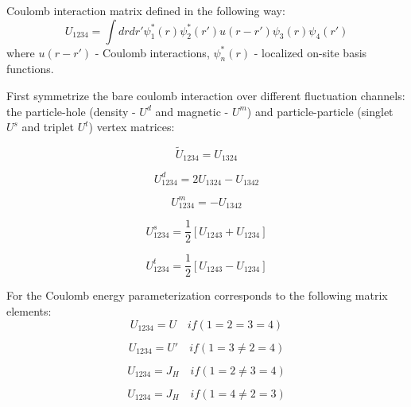 Coulomb interaction matrix defined in the following way:
\begin{equation}
U_{1234} = \int dr dr' \psi^*_{1}(r) \psi^*_{2}(r') u (r-r') \psi_{3}(r) \psi_{4}(r') 
\end{equation}
where $ u (r-r')$ - Coulomb interactions, $\psi^*_{n}(r)$ - localized on-site basis functions.


First symmetrize the bare coulomb interaction over different fluctuation channels: the particle-hole (density - $U^d$ and magnetic - $U^m$) and particle-particle (singlet $U^s$ and triplet $U^t$) vertex matrices:

\begin{equation}
{\tilde{U}}_{1234} = U_{1324}
\end{equation}

\begin{equation}
U^d_{1234} = 2U_{1324}-U_{1342}
\end{equation}

\begin{equation}
U^m_{1234} = -U_{1342}
\end{equation}
  
\begin{equation}
U^s_{1234} = \frac{1}{2}[U_{1243}+U_{1234}]
\end{equation}

\begin{equation}
U^t_{1234} = \frac{1}{2}[U_{1243}-U_{1234}]
\end{equation}

For the Coulomb energy parameterization corresponds to the following matrix elements:
\begin{equation}
U_{1234} = U \quad if (1=2=3=4)
\end{equation}

\begin{equation}
U_{1234} = U' \quad if (1=3\neq2=4)
\end{equation}

\begin{equation}
U_{1234} = J_H \quad if (1=2\neq3=4)
\end{equation}

\begin{equation}
U_{1234} = J_H \quad if (1=4\neq2=3)
\end{equation}

